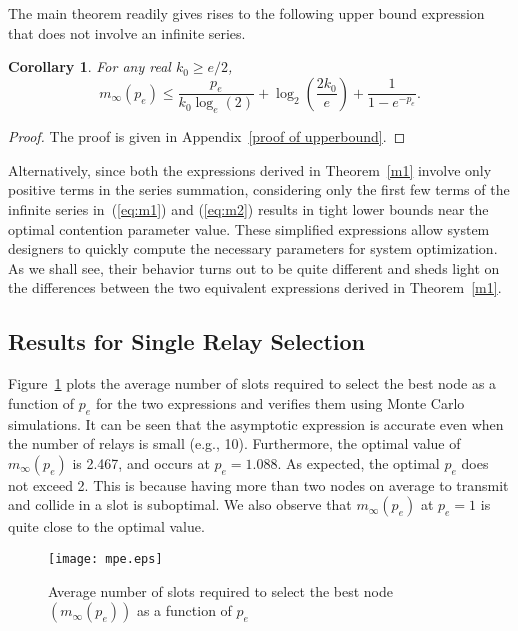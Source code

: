 \documentclass[12pt,draftcls,peerreview, onecolumn]{IEEEtran}
\newtheorem{corollary}{{\bf Corollary}}
\newcommand{\eqn}[1]{(\ref{#1})}
\newcommand{\brac}[1]{\left({#1}\right)}
\newcommand{\aveslots}[1]{m_{#1}}
\begin{document}
The main theorem readily gives rises to the following upper bound expression that does not involve an infinite series.  
\begin{corollary} \label{upperbound}
For any real $k_0 \geq e/2$,
\begin{equation} \label{eq:upperbound}
\aveslots{\infty}(p_e) \le \frac{p_e}{k_0\log_{e}(2)} + \log_2\brac{\frac{2 k_0}{e}} + \frac{1}{1-e^{-p_e}}.
\end{equation}

\end{corollary}
\begin{proof}
The proof is given in Appendix~\ref{proof of upperbound}.
\end{proof}


Alternatively, since both the expressions derived in Theorem~\ref{m1}
involve only positive terms in the series summation, considering only
the first few terms of the infinite series in~\eqn{eq:m1} and
\eqn{eq:m2} results in tight lower bounds near the optimal contention
parameter value.  These simplified expressions allow system designers
to quickly compute the necessary parameters for system optimization.
As we shall see, their behavior turns out to be quite different and
sheds light on the differences between the two equivalent expressions
derived in Theorem~\ref{m1}.


\subsection{Results for Single Relay Selection}

Figure~\ref{fig:m(p_e)} plots the average number of slots required to
select the best node as a function of $p_{e}$ for the two expressions
and verifies them using Monte Carlo simulations.  It can be seen that
the asymptotic expression is accurate even when the number of relays
is small (e.g., 10). Furthermore, the optimal value of
$\aveslots{\infty}(p_{e})$ is 2.467, and occurs at $p_e=1.088$. As
expected, the optimal $p_e$ does not exceed 2. This is because having
more than two nodes on average to transmit and collide in a slot is
suboptimal. We also observe that $\aveslots{\infty}(p_{e})$ at $p_e =
1$ is quite close to the optimal value.
\begin{figure}[p]
        \centering
                \texttt{[image: mpe.eps]}
                \caption{Average number of slots required to select the best node $(\aveslots{\infty}(p_e))$ as a function of $p_e$ }
        \label{fig:m(p_e)}
\end{figure}
\end{document}
